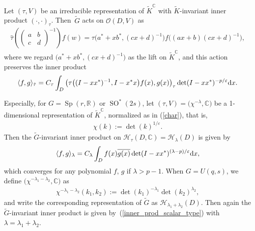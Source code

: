 \documentclass[pdftex]{sigma}
\numberwithin{equation}{section}
\newcommand{\BR}{\mathbb{R}}
\newcommand{\BC}{\mathbb{C}}
\newcommand{\cH}{\mathcal{H}}
\newcommand{\cO}{\mathcal{O}}
\begin{document}
Let $(\tau,V)$ be an irreducible representation of $\tilde{K}^\BC$ with $\tilde{K}$-invariant inner product $(\cdot,\cdot)_\tau$.
Then~$\tilde{G}$ acts on $\cO(D,V)$ as
\begin{gather*} \hat{\tau}\left(\begin{pmatrix}a&b\\c&d\end{pmatrix}^{-1}\right)f(w)
=\tau\big(a^*+xb^*,(cx+d)^{-1}\big)f\big((ax+b)(cx+d)^{-1}\big), \end{gather*}
where we regard $\big(a^*+xb^*,(cx+d)^{-1}\big)$ as the lift on $\tilde{K}^\BC$, and this action preserves the inner product
\begin{gather*} \langle f,g\rangle_{\hat{\tau}}=C_\tau\int_D
\big(\tau\big((I-xx^*)^{-1},I-x^*x\big)f(x),g(x)\big)_\tau \det(I-xx^*)^{-p/\varepsilon}{\rm d}x. \end{gather*}

Especially, for $G=\operatorname{Sp}(r,\BR)$ or $\operatorname{SO}^*(2s)$, let $(\tau,V)=\big(\chi^{-\lambda},\BC\big)$ be a 1-dimensional representation of $\tilde{K}^\BC$,
normalized as in (\ref{char}), that is,
\begin{gather*} \chi(k):=\det(k)^{1/\varepsilon}. \end{gather*}
Then the $\tilde{G}$-invariant inner product on $\cH_\tau(D,\BC)=\cH_\lambda(D)$ is given by
\begin{gather}\label{inner_prod_scalar_type}
\langle f,g\rangle_\lambda=C_\lambda\int_D f(x)\overline{g(x)} \det(I-xx^*)^{(\lambda-p)/\varepsilon}{\rm d}x,
\end{gather}
which converges for any polynomial $f$, $g$ if $\lambda>p-1$. When $G=U(q,s)$, we define $\big(\chi^{-\lambda_1-\lambda_2},\BC\big)$ as
\begin{gather}\label{charuqs}
\chi^{-\lambda_1-\lambda_2}(k_1,k_2):=\det(k_1)^{-\lambda_1}\det(k_2)^{\lambda_2},
\end{gather}
and write the corresponding representation of $\tilde{G}$ as $\cH_{\lambda_1+\lambda_2}(D)$. Then again the $\tilde{G}$-invariant inner product is given by~(\ref{inner_prod_scalar_type}) with $\lambda=\lambda_1+\lambda_2$.
\end{document}
